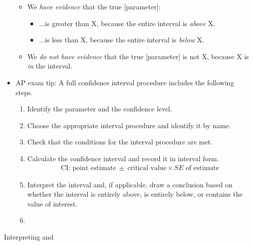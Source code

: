 \begin{itemize}
\begin{itemize}\vspace{-1mm}
\setlength{\itemsep}{0mm}
\item We \emph{have evidence} that the true [parameter]:
\begin{itemize}\vspace{-1mm}
\setlength{\itemsep}{0mm}
\item[]  ...is greater than X, because the entire interval is \emph{above} X.
\item[] ...is less than X, because the entire interval is \emph{below} X.
\end{itemize}
\item We \emph{do not have evidence} that the true [parameter] is not  X, because X is \emph{in} the interval.
\end{itemize}

\item AP exam tip:  A full confidence interval procedure includes the following steps. \vspace{-1mm}
\begin{enumerate}
\setlength{\itemsep}{0mm}
\item {}  Identify the parameter and the confidence level.
\item  {}  Choose the appropriate interval procedure and identify it by name.
\item  {}  Check that the conditions for the interval procedure are met. 
\item {} Calculate the confidence interval and record it in interval form.  
\begin{align*}
\text{CI:  point estimate}\ \pm\  \text{critical value}\times SE \text{ of estimate}
\end{align*}
\item {} Interpret the interval and, if applicable, draw a conclusion based on whether the interval is entirely above, is entirely below, or contains the value of interest.
\item[]
\end{enumerate}
\end{itemize}
Interpreting  and 
